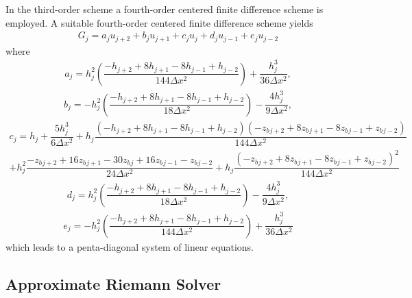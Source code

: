 \documentclass[preprint,sort&compress,1p]{article}
\begin{document}
In the third-order scheme a fourth-order centered finite difference scheme is employed. A suitable fourth-order centered finite difference scheme yields
\begin{gather}
G_j = a_j u_{j+2} + b_j u_{j+1} + c_j u_j + d_j u_{j-1} + e_j u_{j-2}
\label{eq:fd_fourth-order_elliptic}
\end{gather}
where
\begin{gather}
a_j = h^2_j\left(\dfrac{-h_{j+2} + 8 h_{j+1} - 8 h_{j-1} + h_{j-2}}{144 \Delta x^2}\right) + \dfrac{h^3_j}{36 \Delta x^2},
\label{eq:fourthoa}
\end{gather}
\begin{gather}
b_j = -h^2_j\left(\dfrac{-h_{j+2} + 8 h_{j+1} - 8 h_{j-1} + h_{j-2}}{18 \Delta x^2}\right) - \dfrac{4h^3_j}{9 \Delta x^2},
\label{eq:fourthob}
\end{gather}
\begin{gather}
c_j = h_j + \dfrac{5h_j^3}{6 \Delta x^2} + h_j \dfrac{(-  h_{j+2} + 8 h_{j+1} - 8 h_{j-1} + h_{j-2} ) ( - z_b{_{j+2}} + 8 z_b{_{j+1}} - 8 z_b{_{j-1}} + z_b{_{j-2}} ) }{144 \Delta x^2} \nonumber \\ + h_j^2 \dfrac{-z_b{_{j+2}} + 16 z_b{_{j+1}} - 30 z_b{_j} + 16 z_b{_{j-1}} - z_b{_{j-2}}}{24 \Delta x^2} +  h_j \dfrac{(- z_b{_{j+2}} + 8 z_b{_{j+1}} - 8 z_b{_{j-1}} + z_b{_{j-2}})^2}{144 \Delta x^2}
\label{eq:fourthoc}
\end{gather}
\begin{gather}
d_j = h^2_j\left(\dfrac{-h_{j+2} + 8 h_{j+1} - 8 h_{j-1} + h_{j-2}}{18 \Delta x^2}\right) - \dfrac{4h^3_j}{9 \Delta x^2},
\label{eq:fourthod}
\end{gather}
\begin{gather}
e_j = -h^2_j\left(\dfrac{-h_{j+2} + 8 h_{j+1} - 8 h_{j-1} + h_{j-2}}{144 \Delta x^2}\right) + \dfrac{h^3_j}{36 \Delta x^2}
\label{eq:fourthoe}
\end{gather}
which leads to a penta-diagonal system of linear equations.

\subsection{Approximate Riemann Solver}
\end{document}
